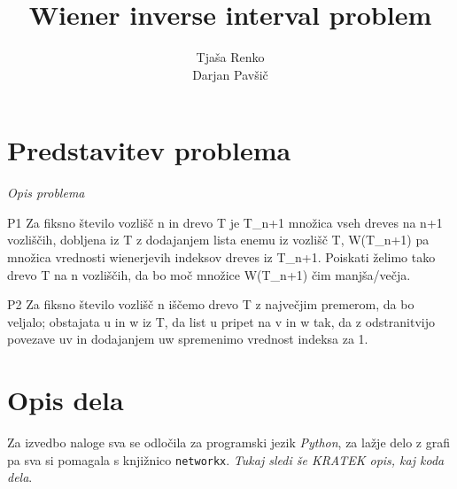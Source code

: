 \documentclass[a4paper, 12 pt]{article}
\title{Wiener inverse interval problem}
\author{Tjaša Renko \\ Darjan Pavšič}
\begin{document}
\maketitle

\section{Predstavitev problema}

\textit{Opis problema}

P1
Za fiksno število vozlišč n in drevo T je T_{n+1} množica vseh dreves na n+1 vozliščih, dobljena iz T z dodajanjem lista enemu iz vozlišč T, W(T_{n+1}) pa množica vrednosti wienerjevih indeksov dreves iz T_{n+1}. Poiskati želimo tako drevo T na n vozliščih, da bo moč množice W(T_{n+1}) čim manjša/večja.

P2
Za fiksno število vozlišč n iščemo drevo T z največjim premerom, da bo veljalo; obstajata u in w iz T, da list u pripet na v in w tak, da z odstranitvijo povezave uv in dodajanjem uw spremenimo vrednost indeksa za 1.

\section{Opis dela}

Za izvedbo naloge sva se odločila za programski jezik \textit{Python}, za lažje delo z grafi pa sva si pomagala s knjižnico \texttt{networkx}.
\textit{Tukaj sledi še KRATEK opis, kaj koda dela}.
\end{document}
